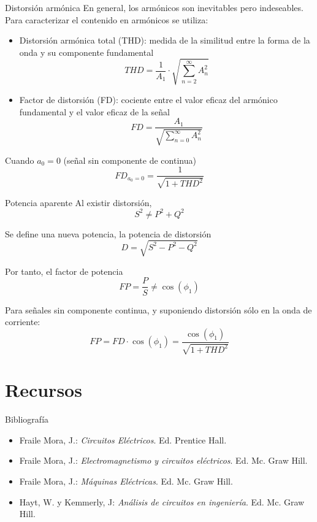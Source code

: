 \documentclass[xcolor={usenames,svgnames,dvipsnames}]{beamer}
\begin{document}
\begin{frame}[label={sec:org13636f7}]{Distorsión armónica}
En general, los armónicos son inevitables pero indeseables. Para
caracterizar el contenido en armónicos se utiliza:

\begin{itemize}
\item \alert{Distorsión armónica total (THD)}: medida de la similitud entre la
forma de la onda y su componente fundamental
$$THD=\frac{1}{A_{1}}\cdot\sqrt{\sum_{n=2}^{\infty}A_{n}^{2}}$$

\item \alert{Factor de distorsión (FD)}: cociente entre el valor eficaz del
armónico fundamental y el valor eficaz de la señal
$$FD=\frac{A_{1}}{\sqrt{\sum_{n=0}^{\infty}A_{n}^{2}}}$$
\end{itemize}

Cuando \(a_{0}=0\) (señal sin componente de continua)
$$FD_{a_{0}=0}=\frac{1}{\sqrt{1+THD^{2}}}$$
\end{frame}

\begin{frame}[label={sec:orgb9a05a5}]{Potencia aparente}
Al existir distorsión, $$S^{2}\neq P^{2}+Q^{2}$$

Se define una nueva potencia, la potencia de distorsión
$$D=\sqrt{S^{2}-P^{2}-Q^{2}}$$

Por tanto, el factor de potencia $$FP=\frac{P}{S}\neq\cos(\phi_{1})$$

Para señales sin componente continua, y suponiendo distorsión sólo en la
onda de corriente:
$$FP=FD\cdot\cos(\phi_{1})=\frac{\cos(\phi_{1})}{\sqrt{1+THD^{2}}}$$
\end{frame}

\section{Recursos}
\label{sec:org9ab4c0b}
\begin{frame}[label={sec:org09cd03f}]{Bibliografía}
\begin{itemize}
\item \alert{Fraile Mora, J.}: \emph{Circuitos Eléctricos}. Ed. Prentice Hall.

\item \alert{Fraile Mora, J.}: \emph{Electromagnetismo y circuitos eléctricos}. Ed.
Mc. Graw Hill.

\item \alert{Fraile Mora, J.}: \emph{Máquinas Eléctricas}. Ed. Mc. Graw Hill.

\item \alert{Hayt, W. y Kemmerly, J}: \emph{Análisis de circuitos en ingeniería}. Ed.
Mc. Graw Hill.
\end{itemize}
\end{frame}
\end{document}

